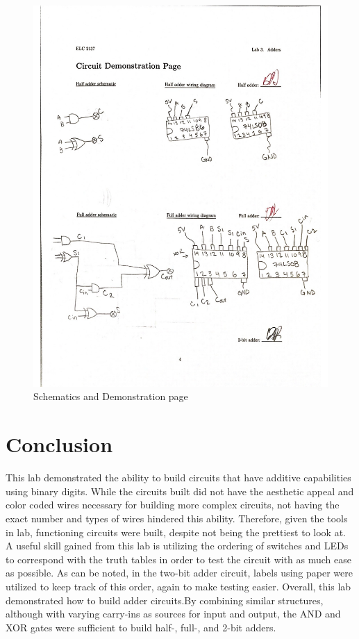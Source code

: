 \documentclass[11pt]{article}
\begin{document}
\begin{figure}
	\includegraphics[width=1.0\textwidth]{"Circuit D"}
	\caption{Schematics and Demonstration page}
\end{figure}


\clearpage

\section*{Conclusion}

This lab demonstrated the ability to build circuits that have additive capabilities using binary digits. While the circuits built did not have the aesthetic appeal and color coded wires necessary for building more complex circuits, not having the exact number and types of wires hindered this ability. Therefore, given the tools in lab, functioning circuits were built, despite not being the prettiest to look at. A useful skill gained from this lab is utilizing the ordering of switches and LEDs to correspond with the truth tables in order to test the circuit with as much ease as possible. As can be noted, in the two-bit adder circuit, labels using paper were utilized to keep track of this order, again to make testing easier. Overall, this lab demonstrated how to build adder circuits.By combining similar structures, although with varying carry-ins as sources for input and output, the AND and XOR gates were sufficient to build half-, full-, and 2-bit adders.
\end{document}
